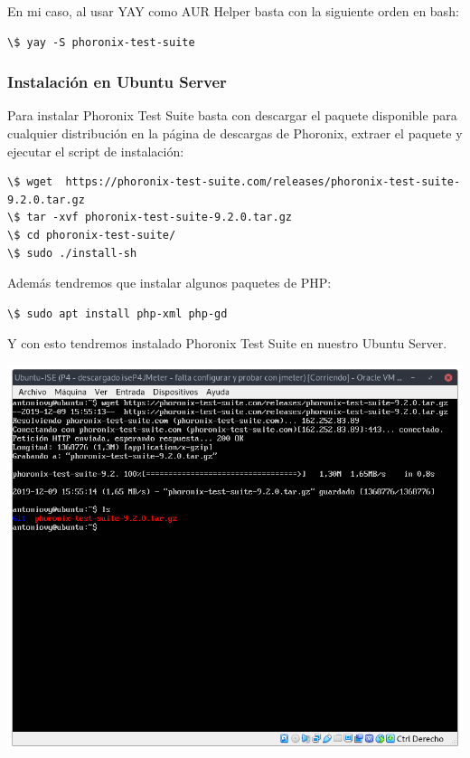 \documentclass[12pt, spanish]{article}
\begin{document}
En mi caso, al usar YAY\cite{yay} como AUR Helper basta con la siguiente orden en bash:

\begin{verbatim}
\$ yay -S phoronix-test-suite 
\end{verbatim}


\subsubsection{Instalación en Ubuntu Server}

Para instalar Phoronix Test Suite basta con descargar el paquete disponible para cualquier distribución en la página de descargas de Phoronix\cite{pts_descarga}, extraer el paquete y ejecutar el script de instalación:

\begin{verbatim}
\$ wget  https://phoronix-test-suite.com/releases/phoronix-test-suite-9.2.0.tar.gz
\$ tar -xvf phoronix-test-suite-9.2.0.tar.gz
\$ cd phoronix-test-suite/
\$ sudo ./install-sh
\end{verbatim}

Además tendremos que instalar algunos paquetes de PHP:

\begin{verbatim}
\$ sudo apt install php-xml php-gd
\end{verbatim}

Y con esto tendremos instalado Phoronix Test Suite en nuestro Ubuntu Server.

\begin{center}
\includegraphics[scale=0.35]{descarga_pts.png}
\end{center}
\end{document}
